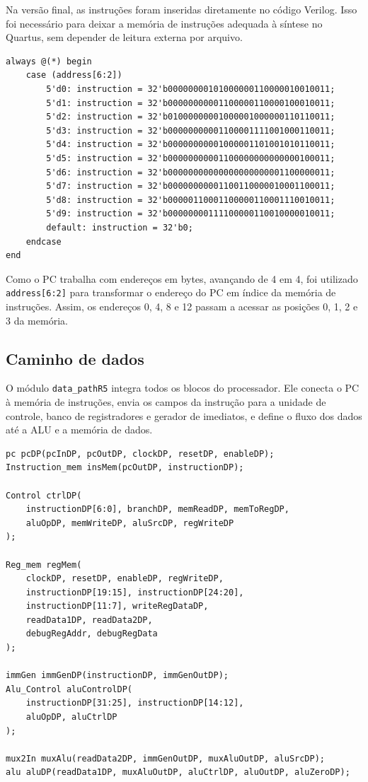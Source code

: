 \documentclass[12pt,a4paper]{article}
\begin{document}
Na versão final, as instruções foram inseridas diretamente no código Verilog. Isso foi necessário para deixar a memória de instruções adequada à síntese no Quartus, sem depender de leitura externa por arquivo.

\begin{lstlisting}[style=verilogstyle,caption={Instruções inseridas manualmente na memória de instruções.}]
always @(*) begin
    case (address[6:2])
        5'd0: instruction = 32'b00000000101000000110000010010011;
        5'd1: instruction = 32'b00000000001100000110000100010011;
        5'd2: instruction = 32'b01000000001000001000000110110011;
        5'd3: instruction = 32'b00000000001100001111001000110011;
        5'd4: instruction = 32'b00000000001000001101001010110011;
        5'd5: instruction = 32'b00000000001100000000000000100011;
        5'd6: instruction = 32'b00000000000000000000001100000011;
        5'd7: instruction = 32'b00000000001100110000010001100011;
        5'd8: instruction = 32'b00000110001100000110001110010011;
        5'd9: instruction = 32'b00000000111100000110010000010011;
        default: instruction = 32'b0;
    endcase
end
\end{lstlisting}

Como o PC trabalha com endereços em bytes, avançando de 4 em 4, foi utilizado \texttt{address[6:2]} para transformar o endereço do PC em índice da memória de instruções. Assim, os endereços 0, 4, 8 e 12 passam a acessar as posições 0, 1, 2 e 3 da memória.

\subsection{Caminho de dados}

O módulo \texttt{data\_pathR5} integra todos os blocos do processador. Ele conecta o PC à memória de instruções, envia os campos da instrução para a unidade de controle, banco de registradores e gerador de imediatos, e define o fluxo dos dados até a ALU e a memória de dados.

\begin{lstlisting}[style=verilogstyle,caption={Integração dos principais módulos no caminho de dados.}]
pc pcDP(pcInDP, pcOutDP, clockDP, resetDP, enableDP);
Instruction_mem insMem(pcOutDP, instructionDP);

Control ctrlDP(
    instructionDP[6:0], branchDP, memReadDP, memToRegDP,
    aluOpDP, memWriteDP, aluSrcDP, regWriteDP
);

Reg_mem regMem(
    clockDP, resetDP, enableDP, regWriteDP,
    instructionDP[19:15], instructionDP[24:20],
    instructionDP[11:7], writeRegDataDP,
    readData1DP, readData2DP,
    debugRegAddr, debugRegData
);

immGen immGenDP(instructionDP, immGenOutDP);
Alu_Control aluControlDP(
    instructionDP[31:25], instructionDP[14:12],
    aluOpDP, aluCtrlDP
);

mux2In muxAlu(readData2DP, immGenOutDP, muxAluOutDP, aluSrcDP);
alu aluDP(readData1DP, muxAluOutDP, aluCtrlDP, aluOutDP, aluZeroDP);
\end{lstlisting}
\end{document}

